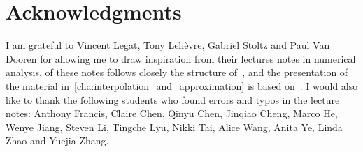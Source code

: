\chapter*{Acknowledgments}%
\label{cha:acknowledgements}

I am grateful to Vincent Legat, Tony Lelièvre, Gabriel Stoltz and Paul Van Dooren for allowing me to draw inspiration from their lectures notes in numerical analysis.
 of these notes follows closely the structure of~\cite[Chapter 3]{VanDooren},
and the presentation of the material in~\cref{cha:interpolation_and_approximation} is based on~\cite{Legat}.
I would also like to thank the following students who found errors and typos in the lecture notes:
Anthony Francis, Claire Chen, Qinyu Chen, Jinqiao Cheng, Marco He, Wenye Jiang, Steven Li, Tingche Lyu, Nikki Tai, Alice Wang, Anita Ye, Linda Zhao and Yuejia Zhang.
